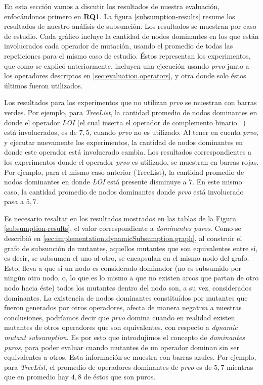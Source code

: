 En esta secci\'on vamos a discutir los resultados de nuestra evaluaci\'on, enfoc\'andonos primero en \textbf{RQ1}. La figura \ref{subsumption-results} resume los resultados de nuestro an\'alisis de subsunci\'on. Los resultados se muestran por caso de estudio. Cada gr\'afico incluye la cantidad de nodos dominantes en los que est\'an involucrados cada operador de mutaci\'on, usando el promedio de todas las repeticiones para el mismo caso de estudio. \'Estos representan los experimentos, que como se explic\'o anteriormente, incluyen una ejecuci\'on usando \emph{prvo} junto a los operadores descriptos en \ref{sec:evaluation.operators}, y otra donde solo \'estos \'ultimos fueron utilizados.

Los resultados para los experimentos que no utilizan \emph{prvo} se muestran con barras verdes. Por ejemplo, para \emph{TreeList}, la cantidad promedio de nodos dominantes en donde el operador \emph{LOI} (el cual inserta el operador de complemento binario \emph{~}) est\'a involucrados, es de $7,5$, cuando \emph{prvo} no es utilizado. Al tener en cuenta \emph{prvo}, y ejecutar nuevamente los experimentos, la cantidad de nodos dominantes en donde este operador est\'a involucrado cambia. Los resultados correspondientes a los experimentos donde el operador \emph{prvo} es utilizado, se muestran en barras rojas. Por ejemplo, para el mismo caso anterior (TreeList), la cantidad promedio de nodos dominantes en donde \emph{LOI} est\'a presente disminuye a 7. En este mismo caso, la cantidad promedio de nodos dominantes donde \emph{prvo} est\'a involucrado pasa a $5,7$.

Es necesario resaltar en los resultados mostrados en las tablas de la Figura \ref{subsumption-results}, el valor correspondiente a \emph{dominantes puros}. Como se describi\'o en \ref{sec:implementation.dynamicSubsumption.graph}, al construir el grafo de subsunci\'on de mutantes, aquellos mutantes que son equivalentes entre s\'i, es decir, se subsumen el uno al otro, se encapsulan en el mismo nodo del grafo. Esto, lleva a que si un nodo es considerado dominador (no es subsumido por ning\'un otro nodo, o, lo que es lo mismo a que no existen arcos que partan de otro nodo hacia \'este) todos los mutantes dentro del nodo son, a su vez, considerados dominantes. La existencia de nodos dominantes constitu\'idos por mutantes que fueron generados por otros operadores, afecta de manera negativa a nuestras conclusiones, podr\'iamos decir que \emph{prvo} domina cuando en realidad existen mutantes de otros operadores que son equivalentes, con respecto a \emph{dynamic mutant subsumption}. Es por esto que introdujimos el concepto de \emph{dominantes puros}, para poder evaluar cuando mutantes de un operador dominan sin ser equivalentes a otros. Esta informaci\'on se muestra con barras azules. Por ejemplo, para \emph{TreeList}, el promedio de operadores dominantes de \emph{prvo} es de $5,7$ mientras que en promedio hay $4,8$ de \'estos que son puros.


